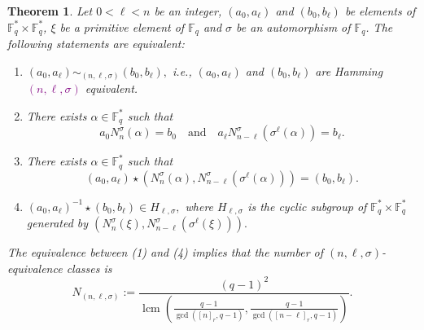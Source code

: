 \documentclass[12pt,paper]{article}
\theoremstyle{plain}
\newtheorem{theorem}{Theorem}[section] %
\newcommand{\Fq}{\mathbb{F}_{q}}
\DeclareMathOperator{\lcm}{lcm}
\begin{document}
\begin{theorem}\label{Th.1}
 Let $0<\ell<n$ be an integer,  $(a_0, a_{\ell})$ and $(b_0, b_{\ell})$ be elements of $\mathbb{F}_q^{*} \times \mathbb{F}_q^{*}$,   $\xi$ be  a primitive element of $\Fq$   and  $ \sigma$ be an automorphism of $\Fq$. The following statements are equivalent:

\begin{enumerate}
    \item $(a_0, a_{\ell}) \sim_{(n,\ell,\sigma)} (b_0, b_{\ell}),$ i.e.,  $(a_0, a_{\ell}) $ and  $ (b_0, b_{\ell})$ are Hamming \textcolor{purple}{$(n,\ell,\sigma)$} equivalent.  

\item   There exists $\alpha\in \Fq^*$ such that $$ a_0 N_n^{\sigma}(\alpha)  = b_0   \quad  \text{and} \quad   a_{\ell} N^{\sigma}_{n-\ell}(\sigma^{\ell}(\alpha))=  b_{\ell}. $$
\item  There exists $\alpha\in \Fq^*$ such that $$ (a_0, a_{\ell}) \star
\left( N_n^{\sigma}(\alpha), N_{n-\ell}^{\sigma}(\sigma^{\ell} (\alpha)) \right)= (b_0,b_{\ell}) .$$
    
 \item   $ (a_0,a_{\ell})^{-1}\star (b_0,b_{\ell})\in H_{\ell,\sigma},$ where   $H_{\ell,\sigma}$ is the cyclic subgroup of $\Fq^*\times \Fq^*$ generated by $\left(N^{\sigma}_{n}(\xi), N_{n-\ell}^{\sigma}(\sigma^{\ell} (\xi))   \right).$
\end{enumerate}
The equivalence between (1) and (4) implies that the number of $(n,\ell,\sigma)$-equivalence classes is $$N_{(n,\ell,\sigma)}:= \dfrac{ (q-1)^2}{ \lcm\left(
\frac{q-1}{\gcd([n]_r,q-1)}, \frac{q-1}{ \gcd([n-\ell]_r,q-1)}\right)} .$$
\end{theorem}
\end{document}
